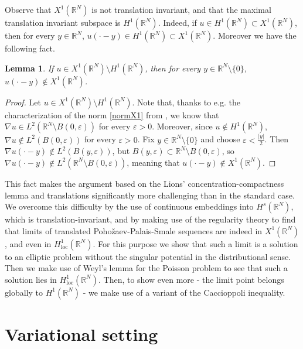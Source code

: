 \documentclass[12pt,leqno,twoside,sort]{amsart}
\newtheorem{Lem}[Th]{Lemma}
\newcommand{\R}{\mathbb{R}}
\numberwithin{equation}{section}
\begin{document}
Observe that $X^1 (\R^N)$ is not translation invariant, and that the maximal translation invariant subspace is $H^1 (\R^N)$. Indeed, if $u \in H^1 (\R^N) \subset X^1 (\R^N)$, then for every $y \in \R^N$, $u(\cdot - y) \in H^1 (\R^N) \subset X^1 (\R^N)$. Moreover we have the following fact.

\begin{Lem}
If $u \in X^1 (\R^N) \setminus H^1 (\R^N)$, then for every $y \in \R^N \setminus \{0\}$, $u(\cdot -y) \not\in X^1 (\R^N)$.
\end{Lem}

\begin{proof}
Let $u \in X^1 (\R^N) \setminus H^1 (\R^N)$. Note that, thanks to e.g. the characterization of the norm \eqref{normX1} from \cite{TrachanasZographopoulos, TrachanasZographopoulosCor}, we know that $\nabla u \in L^2 (\R^N \setminus B(0,\varepsilon))$ for every $\varepsilon > 0$. Moreover, since $u \not\in H^1 (\R^N)$, $\nabla u \not\in L^2 (B(0,\varepsilon))$ for every $\varepsilon > 0$. Fix $y \in \R^N \setminus \{0\}$ and choose $\varepsilon < \frac{|y|}{2}$. Then $\nabla u(\cdot - y) \not\in L^2 (B(y,\varepsilon))$, but $B(y,\varepsilon) \subset \R^N \setminus B(0,\varepsilon)$, so $\nabla u (\cdot -y ) \not \in L^2 (\R^N \setminus B(0,\varepsilon))$, meaning that $u (\cdot -y ) \not\in X^1 (\R^N)$.
\end{proof}

This fact makes the argument based on the Lions' concentration-compactness lemma and translations significantly more challenging than in the standard case. We overcome this difficulty by the use of continuous embeddings into $H^s (\R^N)$, which is translation-invariant, and by making use of the regularity theory to find that limits of translated Poho\v{z}aev-Palais-Smale sequences are indeed in $X^1 (\R^N)$, and even in $H^1_{\mathrm{loc}} (\R^N)$. For this purpose we show that such a limit is a solution to an elliptic problem without the singular potential in the distributional sense. Then we make use of Weyl's lemma for the Poisson problem to see that such a solution lies in $H^1_{\mathrm{loc}} (\R^N)$. Then, to show even more - the limit point belongs globally to $H^1(\R^N)$ - we make use of a variant of the Caccioppoli inequality.




\section{Variational setting}\label{sect:3}
\end{document}
